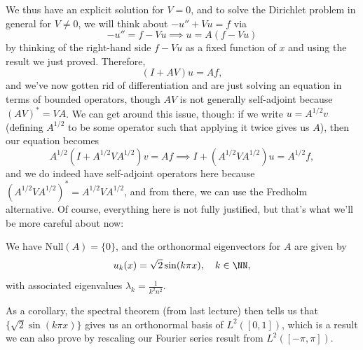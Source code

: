 We thus have an explicit solution for $V = 0$, and to solve the Dirichlet problem in general for $V \ne 0$, we will think about $-u'' + Vu = f$ via
\[
    -u'' = f - Vu \implies u = A(f - Vu)
\]
by thinking of the right-hand side $f - Vu$ as a fixed function of $x$ and using the result we just proved. Therefore, 
\[
    (I + AV)u = Af,
\]
and we've now gotten rid of differentiation and are just solving an equation in terms of bounded operators, though $AV$ is not generally self-adjoint because $(AV)^\ast = VA$. We can get around this issue, though: if we write $u = A^{1/2} v$ (defining $A^{1/2}$ to be some operator such that applying it twice gives us $A$), then our equation becomes 
\[
    A^{1/2}(I + A^{1/2} VA^{1/2})v = Af \implies I + (A^{1/2} V A^{1/2})u = A^{1/2} f,
\]
and we do indeed have self-adjoint operators here because $(A^{1/2}VA^{1/2})^\ast = A^{1/2}VA^{1/2}$, and from there, we can use the Fredholm alternative. Of course, everything here is not fully justified, but that's what we'll be more careful about now:

\begin{theorem}
We have $\text{Null}(A) = \{0\}$, and the orthonormal eigenvectors for $A$ are given by 
\[
    u_k(x) = \sqrt{2} \sin(k \pi x), \quad k \in \NN,
\]
with associated eigenvalues $\lambda_k = \frac{1}{k^2n^2}$. 
\end{theorem}

\begin{remark}
As a corollary, the spectral theorem (from last lecture) then tells us that $\{\sqrt{2} \sin(k \pi x)\}$ gives us an orthonormal basis of $L^2([0, 1])$, which is a result we can also prove by rescaling our Fourier series result from $L^2([-\pi, \pi])$.
\end{remark}


